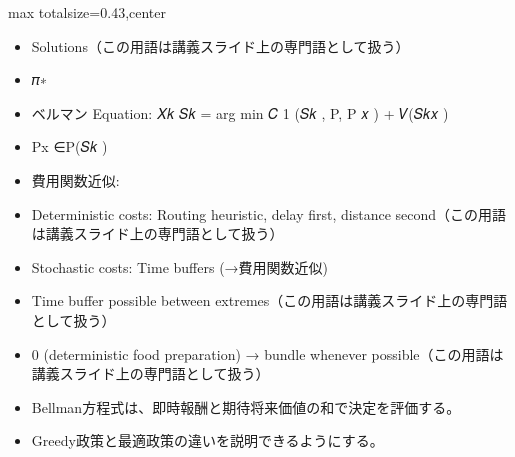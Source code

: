 \clearpage
{}
\begin{minipage}[t]{0.405\textwidth}
\begin{adjustbox}{max totalsize={\textwidth}{0.43\textheight},center}
\begin{minipage}{\textwidth}\scriptsize
{}\begin{itemize}
\item Solutions（この用語は講義スライド上の専門語として扱う）
\item 𝜋∗
\item ベルマン Equation: 𝑋𝑘 𝑆𝑘 = arg min 𝐶 1 (𝑆𝑘 , P, P 𝑥 ) + 𝑉(𝑆𝑘𝑥 )
\item Px ∈P(𝑆𝑘 )
\item 費用関数近似:
\item Deterministic costs: Routing heuristic, delay first, distance second（この用語は講義スライド上の専門語として扱う）
\item Stochastic costs: Time buffers (→費用関数近似)
\item Time buffer possible between extremes（この用語は講義スライド上の専門語として扱う）
\item 0 (deterministic food preparation) → bundle whenever possible（この用語は講義スライド上の専門語として扱う）
\end{itemize}\begin{itemize}
\item Bellman方程式は、即時報酬と期待将来価値の和で決定を評価する。
\item Greedy政策と最適政策の違いを説明できるようにする。
\end{itemize}
\end{minipage}
\end{adjustbox}
\end{minipage}\hfill
